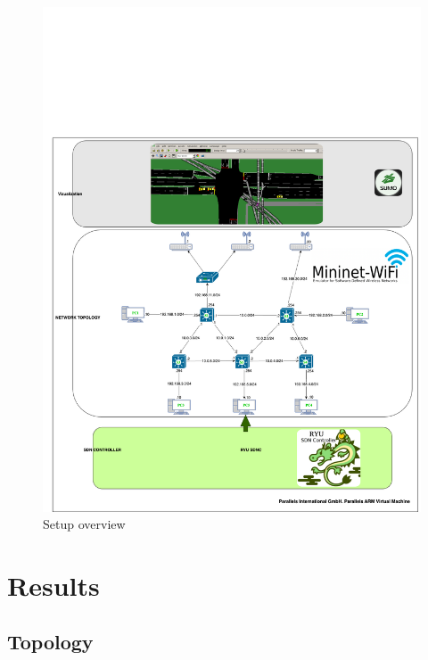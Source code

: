 \documentclass[
  oneside,
  11pt, a4paper,
  footinclude=true,
  headinclude=true,
  cleardoublepage=empty
]{scrbook}
\begin{document}
\begin{figure}[H]
\begin{center}
  \includegraphics[width=1\textwidth]{img/setupcenario.png}
\end{center}
  \caption{Setup overview}
  \centering  
  \label{setup-overview}
\end{figure}






\section{Results}

\subsection{Topology}
\end{document}
